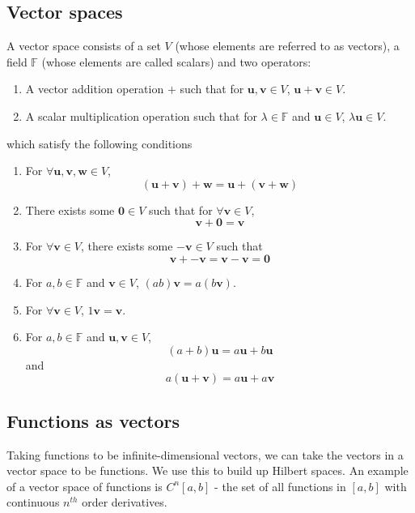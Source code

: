 \documentclass[]{article}
\begin{document}
\subsection{Vector spaces}
A vector space consists of a set $V$ (whose elements are referred to as vectors), a field $\mathbb{F}$ (whose elements are called scalars) and two operators:
\begin{enumerate}
	\item A vector addition operation $+$ such that for $\textbf{u},\textbf{v} \in V$, $\textbf{u} + \textbf{v} \in V$.
	\item A scalar multiplication operation such that for $\lambda \in \mathbb{F}$ and $\textbf{u} \in V$, $\lambda \textbf{u} \in V$.
\end{enumerate}
which satisfy the following conditions
\begin{enumerate}
	\item For $\forall \textbf{u},\textbf{v},\textbf{w} \in V$, 
	\begin{equation} (\textbf{u} + \textbf{v}) + \textbf{w} = \textbf{u} + (\textbf{v} + \textbf{w}) \end{equation}
	\item There exists some $\textbf{0} \in V$ such that for $\forall \textbf{v} \in V$, \begin{equation}\textbf{v} + \textbf{0} = \textbf{v}\end{equation}
	\item For $\forall \textbf{v} \in V$, there exists some $-\textbf{v} \in V$ such that \begin{equation}\textbf{v}+-\textbf{v} = \textbf{v}-\textbf{v}=\textbf{0}\end{equation}
	\item For $a,b \in \mathbb{F}$ and $\textbf{v} \in V$, $(ab)\mathbf{v} = a(b\mathbf{v})$.
	\item For $\forall \textbf{v} \in V$, $1\textbf{v} = \textbf{v}$.
	\item For $a,b \in \mathbb{F}$ and $\textbf{u}, \textbf{v} \in V$, \begin{equation} (a + b)\textbf{u} = a\textbf{u} + b\textbf{u} \end{equation}
	and
	\begin{equation} a(\textbf{u} + \textbf{v}) = a\textbf{u} + a\textbf{v}
	\end{equation}
\end{enumerate}
\subsection{Functions as vectors}
Taking functions to be infinite-dimensional vectors, we can take the vectors in a vector space to be functions. We use this to build up Hilbert spaces. An example of a vector space of functions is $C^{n}[a,b]$ - the set of all functions in $[a,b]$ with continuous $n^{th}$ order derivatives.
\end{document}

